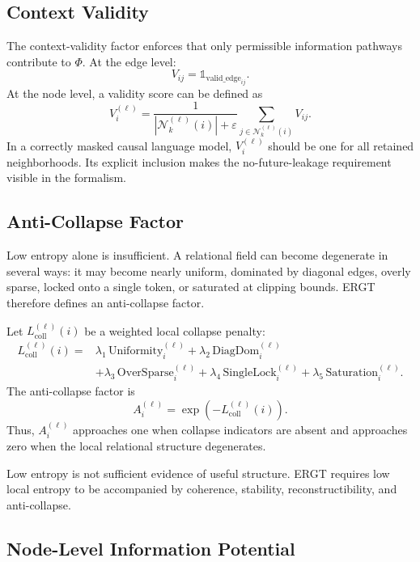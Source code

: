 \documentclass[11pt]{article}
\begin{document}
\subsection{Context Validity}

The context-validity factor enforces that only permissible information pathways contribute to $\Phi$. At the edge level:
\[
V_{ij}=\mathbb{1}_{\mathrm{valid\_edge}_{ij}}.
\]
At the node level, a validity score can be defined as
\[
V_i^{(\ell)}=
\frac{1}{|\mathcal{N}_k^{(\ell)}(i)|+\varepsilon}
\sum_{j\in\mathcal{N}_k^{(\ell)}(i)}V_{ij}.
\]
In a correctly masked causal language model, $V_i^{(\ell)}$ should be one for all retained neighborhoods. Its explicit inclusion makes the no-future-leakage requirement visible in the formalism.

\subsection{Anti-Collapse Factor}

Low entropy alone is insufficient. A relational field can become degenerate in several ways: it may become nearly uniform, dominated by diagonal edges, overly sparse, locked onto a single token, or saturated at clipping bounds. ERGT therefore defines an anti-collapse factor.

Let $L_{\mathrm{coll}}^{(\ell)}(i)$ be a weighted local collapse penalty:
\[
\begin{aligned}
L_{\mathrm{coll}}^{(\ell)}(i)
={}&
\lambda_1\,\mathrm{Uniformity}_i^{(\ell)}
+\lambda_2\,\mathrm{DiagDom}_i^{(\ell)} \\
&+\lambda_3\,\mathrm{OverSparse}_i^{(\ell)}
+\lambda_4\,\mathrm{SingleLock}_i^{(\ell)}
+\lambda_5\,\mathrm{Saturation}_i^{(\ell)}.
\end{aligned}
\]
The anti-collapse factor is
\[
A_i^{(\ell)}=\exp(-L_{\mathrm{coll}}^{(\ell)}(i)).
\]
Thus, $A_i^{(\ell)}$ approaches one when collapse indicators are absent and approaches zero when the local relational structure degenerates.

\begin{ergtclaim}
Low entropy is not sufficient evidence of useful structure. ERGT requires low local entropy to be accompanied by coherence, stability, reconstructibility, and anti-collapse.
\end{ergtclaim}

\subsection{Node-Level Information Potential}
\end{document}
